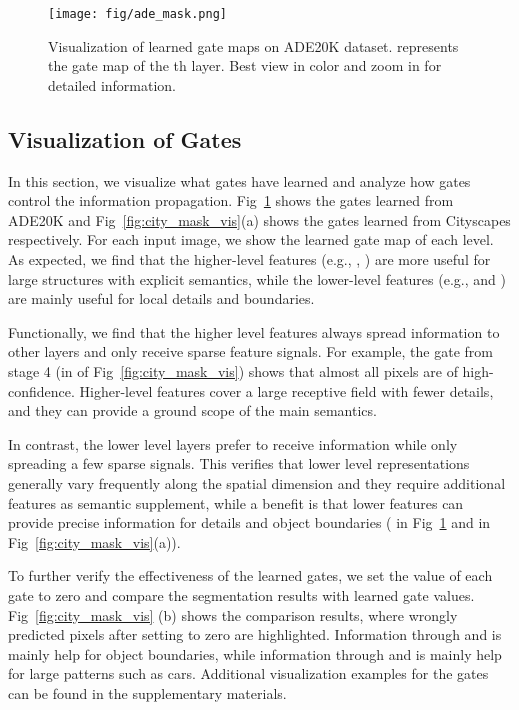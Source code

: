 \documentclass[letterpaper]{article} \usepackage{aaai20}  \usepackage{times}  \usepackage{helvet} \usepackage{courier}  \usepackage[hyphens]{url}  \usepackage{graphicx} \urlstyle{rm} \def\UrlFont{\rm}  \usepackage{graphicx}  \usepackage{amsmath}
\begin{document}
\begin{figure}
\centering
\texttt{[image: fig/ade\_mask.png]}
\caption{Visualization of learned gate maps on ADE20K dataset.  represents the gate map of the th layer. Best view in color and zoom in for detailed information.}
\label{fig:ade_mask_vis}
\end{figure}



\subsection{Visualization of Gates}

    In this section, we visualize what gates have learned and analyze how gates control the information propagation. Fig~\ref{fig:ade_mask_vis} shows the gates learned from ADE20K and Fig~\ref{fig:city_mask_vis}(a) shows the gates learned from Cityscapes respectively. For each input image, we show the learned gate map of each level. As expected, we find that the higher-level features (e.g., , ) are more useful for large structures with explicit semantics, while the lower-level features (e.g.,  and ) are mainly useful for local details and boundaries.
    
    Functionally, we find that the higher level features always spread information to other layers and only receive sparse feature signals. For example, the gate from stage 4 (in  of Fig~\ref{fig:city_mask_vis}) shows that almost all pixels are of high-confidence. Higher-level features cover a large receptive field with fewer details, and they can provide a ground scope of the main semantics.
    
    In contrast, the lower level layers prefer to receive information while only spreading a few sparse signals. This verifies that lower level representations generally vary frequently along the spatial dimension and they require additional features as semantic supplement, while a benefit is that lower features can provide precise information for details and object boundaries ( in Fig~\ref{fig:ade_mask_vis} and  in Fig~\ref{fig:city_mask_vis}(a)).
    
    To further verify the effectiveness of the learned gates, we set the value of each gate  to zero and compare the segmentation results with learned gate values.
    Fig~\ref{fig:city_mask_vis} (b) shows the comparison results, where wrongly predicted pixels after setting  to zero are highlighted. Information through  and  is mainly help for object boundaries, while information through  and  is mainly help for large patterns such as cars. Additional visualization examples for the gates can be found in the supplementary materials.
    
\end{document}
